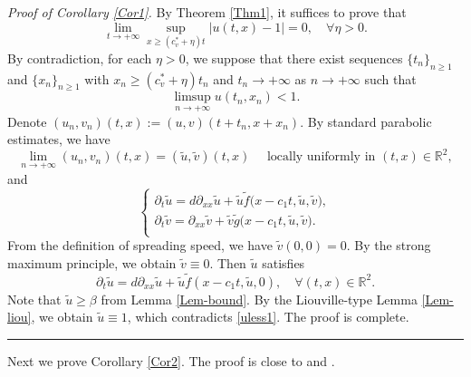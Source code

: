 \documentclass[10pt]{article}
\numberwithin{equation}{section}
\newcommand{\R}{\mathbb{R}}
\newenvironment{proof}[1][Proof]{\noindent\textit{#1.} }{\hfill \rule{0.5em}{0.5em}}
\begin{document}
\begin{proof}[Proof of Corollary \ref{Cor1}]
By Theorem \ref{Thm1}, it  suffices to prove that
\begin{equation*}
\lim_{t\to +\infty} \sup_{ x\geq (c_v^* + \eta) t}  \left|  u(t,x) -1 \right | =0,  \quad  \forall \eta >0.
\end{equation*}
By  contradiction,  for each  $\eta >0$,   we suppose  that there exist sequences $\{ t_n\}_{n\geq 1}$ and $\{ x_n\}_{n\geq 1}$ with $x_n \geq (c_v^* +\eta ) t_n$ and $t_n \to +\infty$ as $n \to+\infty$  such that 
\begin{equation}\label{uless1}
 \limsup_{n\to +\infty}  u(t_n,x_n) <1. 
\end{equation}
  Denote $(u_n, v_n) (t,x) := (u, v) (t+t_n, x+x_n)$. By standard parabolic estimates, 
  we have 
  \begin{equation*}
  \lim_{n\to +\infty} (u_n, v_n)(t,x) = (\tilde{u}, \tilde{v})(t,x) \quad \text{ locally uniformly in }  (t,x) \in \R^2, 
  \end{equation*}
  and 
\begin{equation*}
\begin{cases}
\partial_t \tilde{u}= d \partial_{xx} \tilde{u}  +  \tilde{u}  \tilde{f} \big( x-c_1t, \tilde{u}, \tilde{v} \big),\\
\partial_t \tilde{v}=  \partial_{xx} \tilde{v} + \tilde{v} \tilde{g} \big( x-c_1t, \tilde{u}, \tilde{v} \big).  \\
\end{cases}
\end{equation*}
From the definition of spreading speed,  we have $\tilde{v} (0, 0)=0$. By the strong maximum principle, we obtain $\tilde{v} \equiv 0$. Then $\tilde{ u}$ satisfies 
\begin{equation*}
\partial_t \tilde{u}= d \partial_{xx} \tilde{u} + \tilde{u} \tilde{f} (x-c_1t, \tilde{u}, 0), \quad \forall (t,x) \in \R^2.
\end{equation*}
Note that $\tilde{u} \geq \beta $ from Lemma \ref{Lem-bound}.
By the Liouville-type Lemma \ref{Lem-liou}, we obtain $\tilde u\equiv 1$, which contradicts   
  \eqref{uless1}. The proof is complete.

\end{proof}

Next we prove Corollary \ref{Cor2}. The proof is close to  \cite[Theorem 2.6]{ducrot2019spreading} and \cite[Theorem 4]{LamLee2024pp}. 
\end{document}
